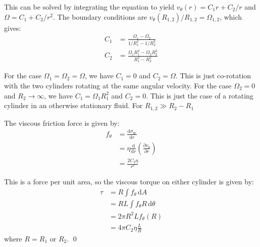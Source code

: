 \documentclass[12pt]{article}
\begin{document}
This can be solved by integrating the equation to yield $v_{\theta}(r) = C_{1} r + C_{2}/r$ and $\Omega = C_{1} + C_{2}/r^{2}$. The boundary conditions are $v_{\theta}(R_{1,2})/R_{1,2} = \Omega_{1,2}$, which gives:
\begin{equation}
    \begin{split}
        C_{1} &= \frac{\Omega_{1} - \Omega_{2}}{1/R_{1}^{2} - 1/R_{2}^{2}} \\
        C_{2} &= \frac{\Omega_{1} R_{1}^{2} - \Omega_{2} R_{2}^{2}}{R_{1}^{2} - R_{2}^{2}}
    \end{split}
\end{equation}

For the case $\Omega_{1} = \Omega_{2} = \Omega$, we have $C_{1} = 0$ and $C_{2} = \Omega$. This is just co-rotation with the two cylinders rotating at the same angular velocity. For the case $\Omega_{2} = 0$ and $R_{2} \to \infty$, we have $C_{1} = \Omega_{1}R_{1}^{2}$ and $C_{2} = 0$. This is just the case of a rotating cylinder in an otherwise stationary fluid. For $R_{1, 2} \gg R_{2} - R_{1}$

The viscous friction force is given by:
\begin{equation}
    \begin{split}
        f_{\theta} &= \frac{\mathrm{d}\sigma_{\theta r}}{\mathrm{d}r} \\
        &= \eta \frac{\mathrm{d}}{\mathrm{d}r} \left( \frac{\partial v_{\theta}}{\partial r} \right) \\
        &= \frac{2C_{2} \eta}{r^{3}}
    \end{split}
\end{equation}

This is a force per unit area, so the viscous torque on either cylinder is given by:
\begin{equation}
    \begin{split}
        \tau &= R \int f_{\theta} \, \mathrm{d}A \\
        &= RL \int f_{\theta} R \, \mathrm{d}\theta \\
        &= 2\pi R^{2} L f_{\theta}(R) \\
        &= 4\pi C_{2} \eta \frac{L}{R}
    \end{split}
\end{equation}
where $R = R_{1}$ or $R_{2}$.
\qed


\end{document}
